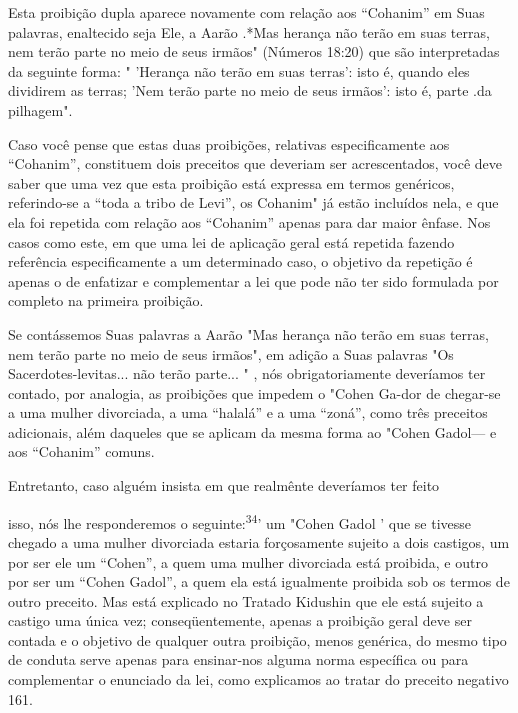 Esta proibição dupla aparece novamente com relação aos ``Cohanim'' em Suas
palavras, enaltecido seja Ele, a Aarão .*Mas herança
não terão em suas terras, nem terão parte no meio de seus irmãos"
(Números 18:20) que são in­terpretadas da seguinte forma: " 'Herança não
terão em suas terras': isto é, quan­do eles dividirem as terras; 'Nem
terão parte no meio de seus irmãos': isto é, parte .da pilhagem".

Caso você pense que estas duas proibições, relativas especificamen­te
aos ``Cohanim'', constituem dois preceitos que deveriam ser acrescentados,
você deve saber que uma vez que esta proibição está expressa em termos
gené­ricos, referindo-se a ``toda a tribo de Levi'', os Cohanim" já estão
incluídos nela, e que ela foi repetida com relação aos ``Cohanim'' apenas
para dar maior ênfase. Nos casos como este, em que uma lei de aplicação
geral está repetida fazendo referência especificamente a um determinado
caso, o objetivo da re­petição é apenas o de enfatizar e complementar a
lei que pode não ter sido for­mulada por completo na primeira proibição.

Se contássemos Suas palavras a Aarão "Mas herança não terão em suas
terras, nem terão parte no meio de seus irmãos", em adição a Suas
pala­vras "Os Sacerdotes-levitas... não terão parte... " , nós
obrigatoriamente deve­ríamos ter contado, por analogia, as proibições
que impedem o "Cohen Ga-dor de chegar-se a uma mulher divorciada, a uma
``halalá'' e a uma ``zoná'', como três preceitos adicionais, além daqueles
que se aplicam da mesma forma ao "Cohen Gadol---  e aos
``Cohanim'' comuns.


Entretanto, caso alguém insista em que realmênte deveríamos ter feito



isso, nós lhe responderemos o seguinte:\textsuperscript{34}' um "Cohen
Gadol ' que se tivesse chegado a uma mulher divorciada estaria
forçosamente sujeito a dois castigos, um por ser ele um ``Cohen'', a quem
uma mulher divorciada está proibida, e outro por ser um ``Cohen Gadol'', a
quem ela está igualmente proibida sob os termos de outro preceito. Mas
está explicado no Tratado Kidushin que ele está sujeito a castigo uma
única vez; conseqüentemente, apenas a proibição geral deve ser contada e
o objetivo de qualquer outra proibição, menos genérica, do mesmo tipo de
conduta serve apenas para ensinar-nos alguma norma espe­cífica ou para
complementar o enunciado da lei, como explicamos ao tratar do preceito
negativo 161.

